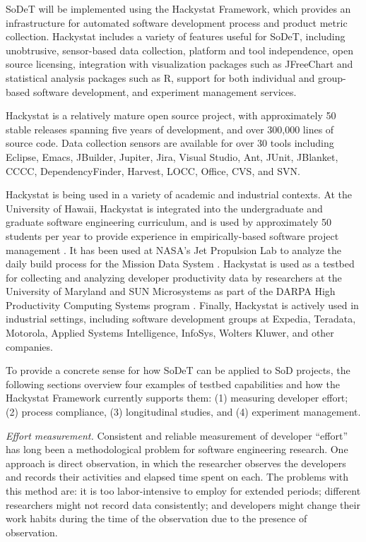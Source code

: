 SoDeT will be implemented using the Hackystat Framework, which
provides an infrastructure for automated software development process and
product metric collection.  Hackystat includes a variety of features useful
for SoDeT, including unobtrusive, sensor-based data collection, 
platform and tool independence, open source licensing, integration with
visualization packages such as JFreeChart and statistical analysis packages
such as R, support for both individual and group-based software development, 
and experiment management services. 

Hackystat is a relatively mature open source project, with approximately 50
stable releases spanning five years of development, and over 300,000 lines
of source code. Data collection sensors are available for over 30 tools
including Eclipse, Emacs, JBuilder, Jupiter, Jira, Visual Studio, Ant,
JUnit, JBlanket, CCCC, DependencyFinder, Harvest, LOCC, Office, CVS, and
SVN.  

Hackystat is being used in a variety of academic and industrial contexts.
At the University of Hawaii, Hackystat is integrated into the undergraduate
and graduate software engineering curriculum, and is used by approximately
50 students per year to provide experience in empirically-based software
project management \cite{csdl2-03-12}. It has been used at NASA's Jet
Propulsion Lab to analyze the daily build process for the Mission Data
System \cite{csdl2-03-07}.  Hackystat is used as a testbed for collecting
and analyzing developer productivity data by researchers at the University
of Maryland and SUN Microsystems as part of the DARPA High Productivity
Computing Systems program \cite{Hochstein05,csdl2-04-03,csdl2-04-22}.
Finally, Hackystat is actively used in industrial settings, including
software development groups at Expedia, Teradata, Motorola, Applied Systems
Intelligence, InfoSys, Wolters Kluwer, and other companies.

To provide a concrete sense for how SoDeT can be applied to SoD projects,
the following sections overview four examples of testbed capabilities and
how the Hackystat Framework currently supports them: (1) measuring
developer effort; (2) process compliance, (3) longitudinal studies, and (4)
experiment management.   

{\em Effort measurement.} Consistent and reliable measurement of developer
``effort'' has long been a methodological problem for software engineering
research.  One approach is direct observation, in which the researcher
observes the developers and records their activities and elapsed time spent
on each.  The problems with this method are: it is too labor-intensive to
employ for extended periods; different researchers might not record data
consistently; and developers might change their work habits during the time
of the observation due to the presence of observation.

